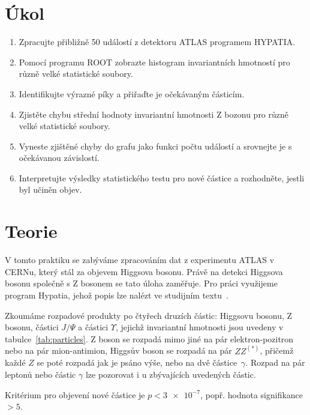 \documentclass{scirep}
\begin{document}
    \section*{Úkol}

    \begin{enumerate}

        \item Zpracujte přibližně 50 událostí z detektoru ATLAS programem HYPATIA.
        \item Pomocí programu ROOT zobrazte histogram invariantních hmotností pro různě velké statistické soubory.
        \item Identifikujte výrazné píky a přiřaďte je očekávaným částicím.
        \item Zjistěte chybu střední hodnoty invariantní hmotnosti Z bozonu pro různě velké statistické soubory.
        \item Vyneste zjištěné chyby do grafu jako funkci počtu událostí a srovnejte je s očekávanou závislostí.
        \item Interpretujte výsledky statistického testu pro nové částice a rozhodněte, jestli byl učiněn objev.

    \end{enumerate}

    \section*{Teorie}

    V tomto praktiku se zabýváme zpracováním dat z experimentu ATLAS v CERNu, který stál za objevem Higgsova bosonu.
    Právě na detekci Higgsova bosonu společně s Z bosonem se tato úloha zaměřuje.
    Pro práci využijeme program Hypatia, jehož popis lze nalézt ve studijním textu~\cite{pokyny}.

    Zkoumáme rozpadové produkty po čtyřech druzích částic: Higgsovu bosonu, Z bosonu, částici $J / \Psi$ a částici $\Upsilon$, jejichž invariantní hmotnosti jsou uvedeny v tabulce~\ref{tab:particles}.
    Z boson se rozpadá mimo jiné na pár elektron-pozitron nebo na pár mion-antimion, Higgsův boson se rozpadá na pár $Z Z^{(*)}$, přičemž každé $Z$ se poté rozpadá jak je psáno výše, nebo na dvě částice~$\gamma$.
    Rozpad na pár leptonů nebo částic $\gamma$ lze pozorovat i u zbývajících uvedených částic.


    Kritérium pro objevení nové částice je $p < \num{3e-7}$, popř. hodnota signifikance $> 5$.
\end{document}

